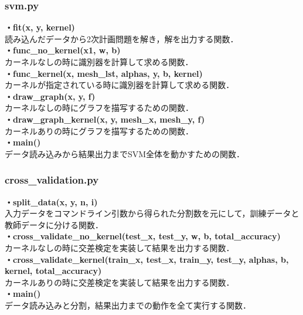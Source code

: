 \documentclass[11pt]{article}
\begin{document}
\subsubsection{svm.py}
\noindent\textbf{・fit(x, y, kernel)}\\
読み込んだデータから2次計画問題を解き，解を出力する関数．\vspace{5pt}\\
\textbf{・func\_no\_kernel(x1, w, b)}\\
カーネルなしの時に識別器を計算して求める関数．\vspace{5pt}\\
\textbf{・func\_kernel(x, mesh\_lst, alphas, y, b, kernel)}\\
カーネルが指定されている時に識別器を計算して求める関数．\vspace{5pt}\\
\textbf{・draw\_graph(x, y, f)}\\
カーネルなしの時にグラフを描写するための関数．\vspace{5pt}\\
\textbf{・draw\_graph\_kernel(x, y, mesh\_x, mesh\_y, f)}\\
カーネルありの時にグラフを描写するための関数．\vspace{5pt}\\
\textbf{・main()}\\
データ読み込みから結果出力までSVM全体を動かすための関数．\vspace{5pt}\\


\subsubsection{cross\_validation.py}
\textbf{・split\_data(x, y, n, i)}\\
入力データをコマンドライン引数から得られた分割数を元にして，訓練データと教師データに分ける関数．\vspace{5pt}\\
\textbf{・cross\_validate\_no\_kernel(test\_x, test\_y, w, b, total\_accuracy)}\\
カーネルなしの時に交差検定を実装して結果を出力する関数．\vspace{5pt}\\
\textbf{・cross\_validate\_kernel(train\_x, test\_x, train\_y, test\_y, alphas, b, kernel, total\_accuracy)}\\
カーネルありの時に交差検定を実装して結果を出力する関数．\vspace{5pt}\\
\textbf{・main()}\\
データ読み込みと分割，結果出力までの動作を全て実行する関数．
\end{document}
